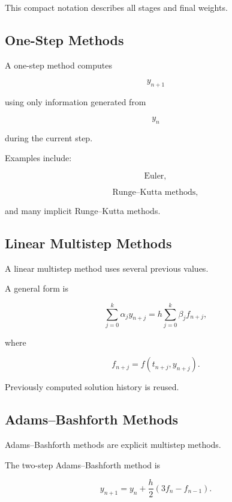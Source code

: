 This compact notation describes all stages and final weights.

\subsection{One-Step Methods}
\label{subsec:one-step-methods}

A one-step method computes

\[
y_{n+1}
\]

using only information generated from

\[
y_n
\]

during the current step.

Examples include:

\[
\boxed{
\text{Euler},
}
\]

\[
\boxed{
\text{Runge--Kutta methods},
}
\]

and many implicit Runge--Kutta methods.

\subsection{Linear Multistep Methods}
\label{subsec:linear-multistep-methods}

A linear multistep method uses several previous values.

A general form is

\[
\boxed{
\sum_{j=0}^{k}
\alpha_j
y_{n+j}
=
h
\sum_{j=0}^{k}
\beta_j
f_{n+j},
}
\]

where

\[
f_{n+j}
=
f(t_{n+j},y_{n+j}).
\]

Previously computed solution history is reused.

\subsection{Adams--Bashforth Methods}
\label{subsec:adams-bashforth}

Adams--Bashforth methods are explicit multistep methods.

The two-step Adams--Bashforth method is

\[
\boxed{
y_{n+1}
=
y_n
+
\frac{h}{2}
\left(
3f_n-f_{n-1}
\right).
}
\]

